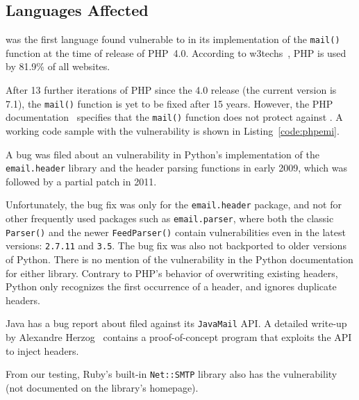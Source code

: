 \subsection{Languages Affected}

\label{languages}
 was the first language found vulnerable to \ehi in its implementation of the \lstinline{mail()} function at the time of release of PHP~4.0. According to w3techs~\cite{W3techs}, PHP is used by 81.9\% of all websites.

After 13 further iterations of PHP since the 4.0 release (the current
version is 7.1), the \texttt{mail()} function is yet to be fixed after
15 years. However, the PHP documentation~\cite{PHPDocs} specifies that the \texttt{mail()} function does not protect against \ehi.
A working code sample with the vulnerability is shown in  Listing~\ref{code:phpemi}.

\begin{sloppypar}
A bug was filed about an \ehi vulnerability in Python's implementation of the \lstinline{email.header} library and the header parsing functions in early 2009, which was followed by a partial patch in 2011.
\end{sloppypar}

Unfortunately, the bug fix was only for the \lstinline{email.header} package, and not for other frequently used packages such as\- \lstinline{email.parser}, where both the classic \lstinline{Parser()} and the newer \lstinline{FeedParser()} contain \ehi vulnerabilities even in the latest versions: \lstinline{2.7.11} and \lstinline{3.5}. The bug fix was also not backported to older versions of Python.
There is no mention of the vulnerability in the Python documentation for either library. Contrary to PHP's behavior of overwriting existing headers, Python only recognizes the first occurrence of a header, and ignores duplicate headers.

Java has a bug report about \ehi filed against its \texttt{JavaMail} API. A detailed write-up by Alexandre Herzog~\cite{Herzog.2014} contains a proof-of-concept program that exploits the API to inject headers.

From our testing, Ruby's built-in \texttt{Net::SMTP} library also has the vulnerability (not documented on the library's homepage).


